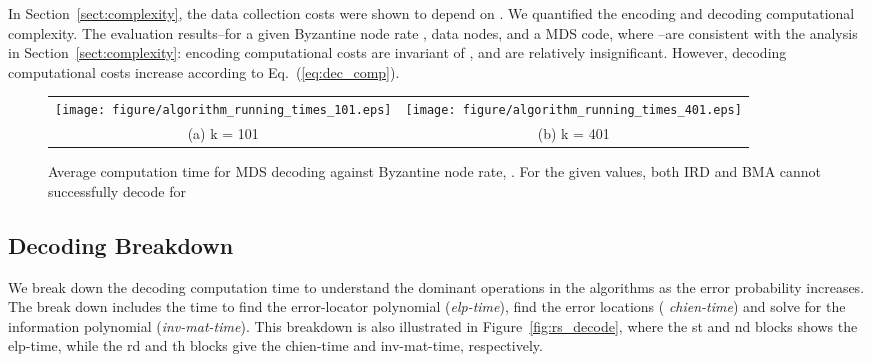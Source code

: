 \documentclass[10pt,journal,letterpaper,compsoc]{IEEEtran}
\newcommand{\0}{{\bf 0}}
\begin{document}
In Section~\ref{sect:complexity}, the data collection costs were shown to depend on 
. We quantified the encoding and decoding computational
complexity. 
The evaluation results--for a given Byzantine node rate ,  data nodes, and a
MDS code, where --are
consistent with the analysis in Section~\ref{sect:complexity}: 
encoding computational costs are invariant
of , and are relatively insignificant. However, decoding computational costs increase according to Eq.~(\ref{eq:dec_comp}).
\begin{comment}
From these results, we conclude that if the joint probability of Byzantine and fail-stop
nodes' is known {\it a priori} to be high,  should only be made small, if the given data collector can bear the
increase in decoding computational costs.
\end{comment}
\begin{figure*}[thp]
\begin{center}
\begin{tabular}{cc}
\texttt{[image: figure/algorithm\_running\_times\_101.eps]} &
\texttt{[image: figure/algorithm\_running\_times\_401.eps]} \\
(a) k = 101 & 
(b) k = 401 
\end{tabular}
\caption{Average computation time for MDS decoding against Byzantine node rate, . 
For the given  values, both IRD and BMA cannot successfully decode for }
\label{fig:alg_time}
\end{center}
\end{figure*}

\subsection{Decoding Breakdown}
We break down the decoding computation time to understand the dominant operations in the algorithms 
as the error probability increases. The break down includes the time 
to find the error-locator polynomial ({\it elp-time}), find the error locations ({\it
chien-time}) and solve for the information polynomial ({\it inv-mat-time}). This
breakdown is also illustrated in
Figure~\ref{fig:rs_decode}, where the st and nd blocks shows the elp-time, while the rd
and th blocks give the chien-time and inv-mat-time, respectively. 
\end{document}
